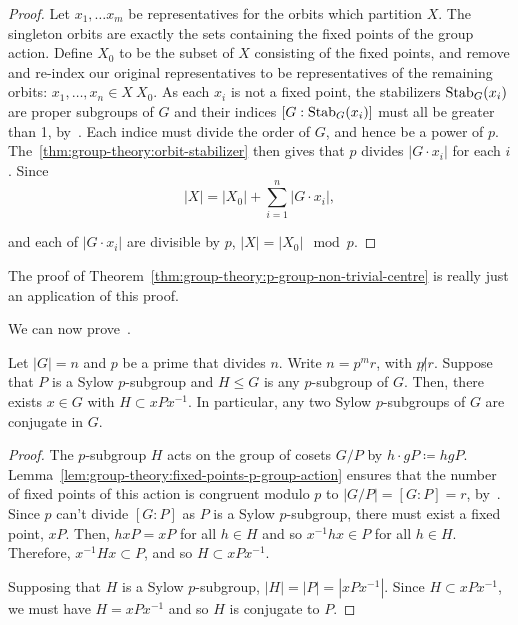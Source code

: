 \begin{proof}
  Let \(x_{1}, \ldots x_{m}\) be representatives for the orbits which partition \(X\). The singleton orbits are exactly the sets containing the fixed points of the group action. Define \(X_{0}\) to be the subset of \(X\) consisting of the fixed points, and remove and re-index our original representatives to be representatives of the remaining orbits: \(x_{1}, \ldots, x_{n} \in X \ X_{0}\). As each \(x_{i}\) is not a fixed point, the stabilizers \(\operatorname{Stab}_{G}(x_{i})\) are proper subgroups of \(G\) and their indices \([G : \operatorname{Stab}_{G}(x_{i})]\) must all be greater than 1, by~. Each indice must divide the order of \(G\), and hence be a power of \(p\). The~\ref{thm:group-theory:orbit-stabilizer} then gives that \(p\) divides \(|G \cdot x_{i}|\) for each \(i\). Since
  \[|X| = |X_{0}| + \sum_{i=1}^{n} |G \cdot x_{i}|,\]

  and each of \(|G \cdot x_{i}|\) are divisible by \(p\), \(|X| = |X_{0}| \mod p\).
\end{proof}

\begin{note}
  The proof of Theorem~\ref{thm:group-theory:p-group-non-trivial-centre} is really just an application of this proof.
\end{note}

We can now prove~.

\begin{theorem}[Sylow 2]\label{thm:group-theory:Sylow-2}
  Let \(|G| = n\) and \(p\) be a prime that divides \(n\). Write \(n = p^{m}r\), with \(p \not| r\). Suppose that \(P\) is a Sylow \(p\)-subgroup and \(H \leq G\) is any \(p\)-subgroup of \(G\). Then, there exists \(x \in G\) with \(H \subset xPx^{-1}\). In particular, any two Sylow \(p\)-subgroups of \(G\) are conjugate in \(G\).
\end{theorem}

\begin{proof}
  The \(p\)-subgroup \(H\) acts on the group of cosets \(G/P\) by \(h \cdot gP \coloneqq hgP\). Lemma~\ref{lem:group-theory:fixed-points-p-group-action} ensures that the number of fixed points of this action is congruent modulo \(p\) to \(|G/P| = [G : P] = r\), by~. Since \(p\) can't divide \([G : P]\) as \(P\) is a Sylow \(p\)-subgroup, there must exist a fixed point, \(xP\). Then, \(hxP = xP\) for all \(h \in H\) and so \(x^{-1}hx \in P\) for all \(h \in H\). Therefore, \(x^{-1}Hx \subset P\), and so \(H \subset xPx^{-1}\).

  Supposing that \(H\) is a Sylow \(p\)-subgroup, \(|H| = |P| = |xPx^{-1}|\). Since \(H \subset xPx^{-1}\), we must have \(H = xPx^{-1}\) and so \(H\) is conjugate to \(P\).
\end{proof}


